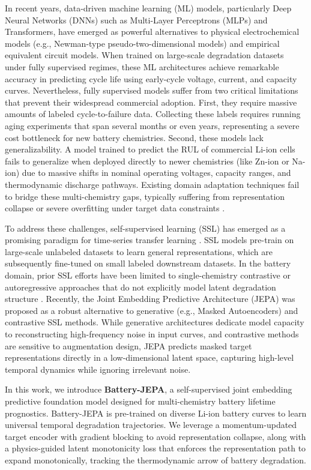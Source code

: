 \documentclass[a4paper,fleqn]{cas-dc}
\begin{document}
In recent years, data-driven machine learning (ML) models, particularly Deep Neural Networks (DNNs) such as Multi-Layer Perceptrons (MLPs) and Transformers, have emerged as powerful alternatives to physical electrochemical models (e.g., Newman-type pseudo-two-dimensional models) and empirical equivalent circuit models. When trained on large-scale degradation datasets under fully supervised regimes, these ML architectures achieve remarkable accuracy in predicting cycle life using early-cycle voltage, current, and capacity curves. Nevertheless, fully supervised models suffer from two critical limitations that prevent their widespread commercial adoption. First, they require massive amounts of labeled cycle-to-failure data. Collecting these labels requires running aging experiments that span several months or even years, representing a severe cost bottleneck for new battery chemistries. Second, these models lack generalizability. A model trained to predict the RUL of commercial Li-ion cells fails to generalize when deployed directly to newer chemistries (like Zn-ion or Na-ion) due to massive shifts in nominal operating voltages, capacity ranges, and thermodynamic discharge pathways. Existing domain adaptation techniques fail to bridge these multi-chemistry gaps, typically suffering from representation collapse or severe overfitting under target data constraints \cite{li2023batteryml}.

To address these challenges, self-supervised learning (SSL) has emerged as a promising paradigm for time-series transfer learning \cite{he2022masked, grill2020bootstrap, caron2021emerging}. SSL models pre-train on large-scale unlabeled datasets to learn general representations, which are subsequently fine-tuned on small labeled downstream datasets. In the battery domain, prior SSL efforts have been limited to single-chemistry contrastive or autoregressive approaches that do not explicitly model latent degradation structure \cite{zhang2020deep, xiong2020critical}. Recently, the Joint Embedding Predictive Architecture (JEPA) \cite{lecun2022path, jepa2023ijepa} was proposed as a robust alternative to generative (e.g., Masked Autoencoders) and contrastive SSL methods. While generative architectures dedicate model capacity to reconstructing high-frequency noise in input curves, and contrastive methods are sensitive to augmentation design, JEPA predicts masked target representations directly in a low-dimensional latent space, capturing high-level temporal dynamics while ignoring irrelevant noise.

In this work, we introduce \textbf{Battery-JEPA}, a self-supervised joint embedding predictive foundation model designed for multi-chemistry battery lifetime prognostics. Battery-JEPA is pre-trained on diverse Li-ion battery curves to learn universal temporal degradation trajectories. We leverage a momentum-updated target encoder with gradient blocking to avoid representation collapse, along with a physics-guided latent monotonicity loss that enforces the representation path to expand monotonically, tracking the thermodynamic arrow of battery degradation.
\end{document}
